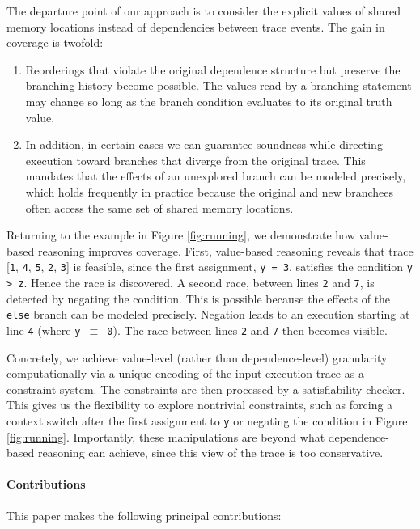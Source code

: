  The departure point of our approach is to consider the explicit values of shared memory locations instead of dependencies between trace events. The gain in coverage is twofold:
 \begin{enumerate}
 	\item Reorderings that violate the original dependence structure but preserve the branching history become possible. The values read by a branching statement may change so long as the branch condition evaluates to its original truth value.
 	\item In addition, in certain cases we can guarantee soundness while directing execution toward branches that diverge from the original trace. This mandates that the effects of an unexplored branch can be modeled precisely, which holds frequently in practice because the original and new branchees often access the same set of shared memory locations.
 \end{enumerate}
 
 Returning to the example in Figure \ref{fig:running}, we demonstrate how value-based reasoning improves coverage. First, value-based reasoning reveals that trace 
 [{\tt 1}, {\tt 4}, {\tt 5}, {\tt 2}, {\tt 3}] is feasible, since the first assignment, {\tt y = 3}, satisfies the condition {\tt y > z}. Hence the race is discovered. A second race, between lines {\tt 2} and {\tt 7}, is detected by negating the condition. This is possible because the effects of the {\tt else} branch can be modeled precisely.
 Negation leads to an execution starting at line {\tt 4} (where {\tt y $\equiv$ 0}). The race between lines {\tt 2} and {\tt 7} then becomes visible.
 
 Concretely, we achieve value-level (rather than dependence-level) granularity computationally via a unique encoding of the input execution trace as a constraint system. The constraints are then processed by a satisfiability checker. This gives us the flexibility to explore nontrivial constraints, such as 
 forcing a context switch after the first assignment to {\tt y} or negating the condition in Figure \ref{fig:running}. Importantly, these manipulations are beyond what dependence-based reasoning can achieve, since this view of the trace is too conservative.
 
\paragraph{Contributions} This paper makes the following principal contributions:




